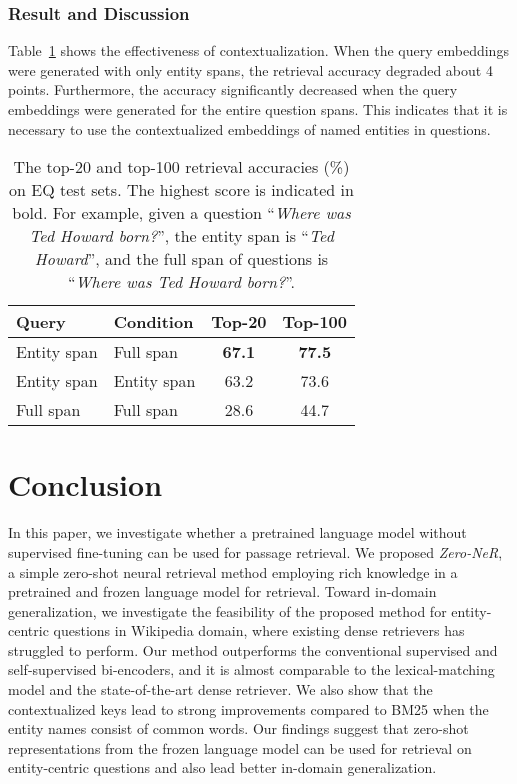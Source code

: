 \documentclass[letterpaper]{article} \usepackage{aaai23}  \usepackage{times}  \usepackage{helvet}  \usepackage{courier}  \usepackage[hyphens]{url}  \usepackage{graphicx} \urlstyle{rm} \def\UrlFont{\rm}  \usepackage{natbib}  \usepackage{caption} \frenchspacing  \setlength{\pdfpagewidth}{8.5in}  \setlength{\pdfpageheight}{11in}  \usepackage{algorithm}
\begin{document}
\subsubsection{Result and Discussion}
Table~\ref{tab:conditioning} shows the effectiveness of contextualization.
When the query embeddings were generated with only entity spans, the retrieval accuracy degraded about 4 points.
Furthermore, the accuracy significantly decreased when the query embeddings were generated for the entire question spans.
This indicates that it is necessary to use the contextualized embeddings of named entities in questions.


\begin{table}[t]
	\centering
	\begin{tabular}{llcc}
		\toprule
		\textbf{Query} & \textbf{Condition} & \textbf{Top-20} & \textbf{Top-100} \\
		\midrule
		Entity span    & Full span          & \textbf{67.1}   & \textbf{77.5}    \\
		Entity span    & Entity span        & 63.2            & 73.6             \\
		Full span      & Full span          & 28.6            & 44.7             \\
		\bottomrule
	\end{tabular}
	\caption{
		The top-20 and top-100 retrieval accuracies (\%) on EQ test sets. The highest score is indicated in bold.
		For example, given a question ``\textit{Where was Ted Howard born?}'', the entity span is ``\textit{Ted Howard}'', and the full span of questions is ``\textit{Where was Ted Howard born?}''.
	}
	\label{tab:conditioning}
\end{table}


\section{Conclusion}
In this paper, we investigate whether a pretrained language model without supervised fine-tuning can be used for passage retrieval.
We proposed \textit{Zero-NeR}, a simple zero-shot neural retrieval method employing rich knowledge in a pretrained and frozen language model for retrieval.
Toward in-domain generalization, we investigate the feasibility of the proposed method for entity-centric questions in Wikipedia domain, where existing dense retrievers has struggled to perform.
Our method outperforms the conventional supervised and self-supervised bi-encoders, and it is almost comparable to the lexical-matching model and the state-of-the-art dense retriever.
We also show that the contextualized keys lead to strong improvements compared to BM25 when the entity names consist of common words.
Our findings suggest that zero-shot representations from the frozen language model can be used for retrieval on entity-centric questions and also lead better in-domain generalization.
\end{document}
